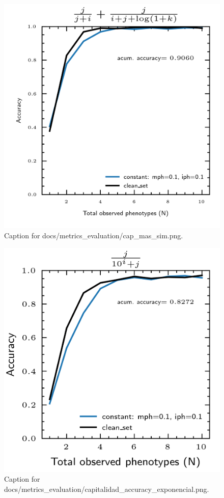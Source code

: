 \documentclass{article}
\begin{document}
\begin{figure}[h] \centering \includegraphics{docs/metrics_evaluation/cap_mas_sim.png} \caption{Caption for docs/metrics_evaluation/cap_mas_sim.png.} \end{figure}
\begin{figure}[h] \centering \includegraphics{docs/metrics_evaluation/capitalidad_accuracy_exponencial.png} \caption{Caption for docs/metrics_evaluation/capitalidad_accuracy_exponencial.png.} \end{figure}
\end{document}
